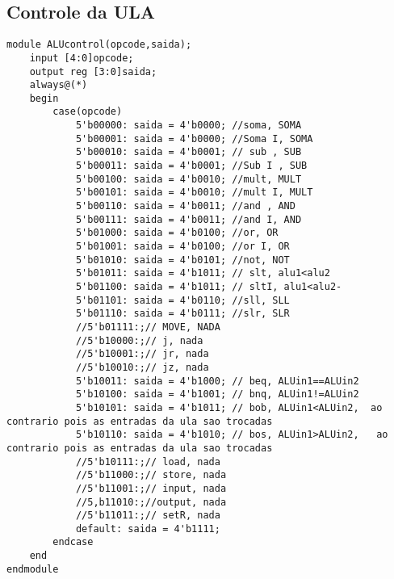 \subsection{Controle da ULA}
\begin{lstlisting}
module ALUcontrol(opcode,saida);
	input [4:0]opcode;
	output reg [3:0]saida;
	always@(*)
	begin
		case(opcode)
			5'b00000: saida = 4'b0000; //soma, SOMA
			5'b00001: saida = 4'b0000; //Soma I, SOMA
			5'b00010: saida = 4'b0001; // sub , SUB
			5'b00011: saida = 4'b0001; //Sub I , SUB
			5'b00100: saida = 4'b0010; //mult, MULT
			5'b00101: saida = 4'b0010; //mult I, MULT
			5'b00110: saida = 4'b0011; //and , AND
			5'b00111: saida = 4'b0011; //and I, AND
			5'b01000: saida = 4'b0100; //or, OR
			5'b01001: saida = 4'b0100; //or I, OR
			5'b01010: saida = 4'b0101; //not, NOT
			5'b01011: saida = 4'b1011; // slt, alu1<alu2
			5'b01100: saida = 4'b1011; // sltI, alu1<alu2-
			5'b01101: saida = 4'b0110; //sll, SLL
			5'b01110: saida = 4'b0111; //slr, SLR
			//5'b01111:;// MOVE, NADA
			//5'b10000:;// j, nada
			//5'b10001:;// jr, nada
			//5'b10010:;// jz, nada
			5'b10011: saida = 4'b1000; // beq, ALUin1==ALUin2 
			5'b10100: saida = 4'b1001; // bnq, ALUin1!=ALUin2 
			5'b10101: saida = 4'b1011; // bob, ALUin1<ALUin2,  ao contrario pois as entradas da ula sao trocadas
			5'b10110: saida = 4'b1010; // bos, ALUin1>ALUin2,   ao contrario pois as entradas da ula sao trocadas
			//5'b10111:;// load, nada
			//5'b11000:;// store, nada
			//5'b11001:;// input, nada
			//5,b11010:;//output, nada
			//5'b11011:;// setR, nada
			default: saida = 4'b1111;
		endcase
	end
endmodule


\end{lstlisting}
\clearpage

